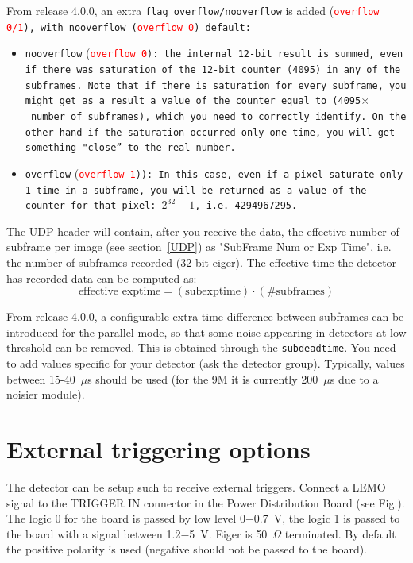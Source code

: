 \documentclass{article}
\begin{document}
{{{From release 4.0.0, an extra {\tt{flag overflow/nooverflow}} is added (\tt{\textcolor{red}{overflow 0/1}}), with {\tt{nooverflow}} (\tt{\textcolor{red}{overflow 0}}) default:
\begin{itemize}
\item {\tt{nooverflow}} (\tt{\textcolor{red}{overflow 0}}): the internal 12-bit result is summed, even if there was saturation of the 12-bit counter (4095) in any of the subframes. Note that if there is saturation for every subframe, you might get as a result a value of the counter equal to (4095$\times$~number~of~subframes), which you need to correctly identify. On the other hand if the saturation occurred only one time, you will get something "close'' to the real number.
\item {\tt{overflow}} (\tt{\textcolor{red}{overflow 1}})): In this case, even if a pixel saturate only 1 time in a subframe, you will be returned as a value of the counter for that pixel: $2^{32}-1$, i.e. 4294967295.  
\end{itemize}

The UDP header will contain, after you receive the data, the effective number of subframe per image (see section~\ref{UDP}) as  "SubFrame Num or Exp Time", i.e. the number of subframes recorded  (32 bit eiger).
The effective time the detector has recorded data can be computed as:
\begin{equation}
\textrm{effective exptime}=(\textrm{subexptime})\cdot (\textrm{\# subframes})
\end{equation}

 From release 4.0.0, a configurable extra time difference between subframes can be introduced for the parallel mode, so that some noise appearing in detectors at low threshold can be removed. This is obtained through the {\tt{subdeadtime}}. You need to add values specific for your detector (ask the detector group). Typically, values between 15-40~$\mu$s should be used (for the 9M it is currently 200~$\mu$s due to a noisier module).



\section{External triggering options}\label{triggering}
The detector can be setup such to receive external triggers. Connect a LEMO signal to the TRIGGER IN connector in the Power Distribution Board (see Fig.). The logic 0 for the board is passed by low level 0$-$0.7~V, the logic 1 is passed to the board with a signal between 1.2$-$5~V. Eiger is 50~$\Omega$ terminated. By default the positive polarity is used (negative should not be passed to the board).

}}}
\end{document}
